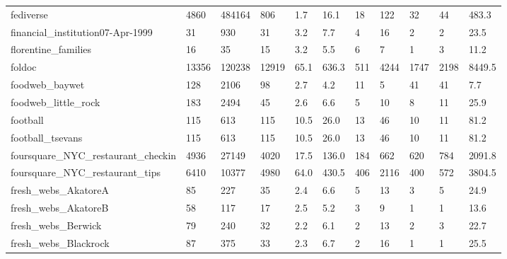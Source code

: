 \begin{longtable}{lllllllllll}
 fediverse                                          & 4860       & 484164    & 806   & 1.7    & 16.1   & 18    & 122    & 32     & 44     & 483.3   \\
 financial\_institution07-Apr-1999                   & 31         & 930       & 31    & 3.2    & 7.7    & 4     & 16     & 2      & 2      & 23.5    \\
 florentine\_families                                & 16         & 35        & 15    & 3.2    & 5.5    & 6     & 7      & 1      & 3      & 11.2    \\
 foldoc                                             & 13356      & 120238    & 12919 & 65.1   & 636.3  & 511   & 4244   & 1747   & 2198   & 8449.5  \\
 foodweb\_baywet                                     & 128        & 2106      & 98    & 2.7    & 4.2    & 11    & 5      & 41     & 41     & 7.7     \\
 foodweb\_little\_rock                                & 183        & 2494      & 45    & 2.6    & 6.6    & 5     & 10     & 8      & 11     & 25.9    \\
 football                                           & 115        & 613       & 115   & 10.5   & 26.0   & 13    & 46     & 10     & 11     & 81.2    \\
 football\_tsevans                                   & 115        & 613       & 115   & 10.5   & 26.0   & 13    & 46     & 10     & 11     & 81.2    \\
 foursquare\_NYC\_restaurant\_checkin                  & 4936       & 27149     & 4020  & 17.5   & 136.0  & 184   & 662    & 620    & 784    & 2091.8  \\
 foursquare\_NYC\_restaurant\_tips                     & 6410       & 10377     & 4980  & 64.0   & 430.5  & 406   & 2116   & 400    & 572    & 3804.5  \\
 fresh\_webs\_AkatoreA                                & 85         & 227       & 35    & 2.4    & 6.6    & 5     & 13     & 3      & 5      & 24.9    \\
 fresh\_webs\_AkatoreB                                & 58         & 117       & 17    & 2.5    & 5.2    & 3     & 9      & 1      & 1      & 13.6    \\
 fresh\_webs\_Berwick                                 & 79         & 240       & 32    & 2.2    & 6.1    & 2     & 13     & 2      & 3      & 22.7    \\
 fresh\_webs\_Blackrock                               & 87         & 375       & 33    & 2.3    & 6.7    & 2     & 16     & 1      & 1      & 25.5    \\

\end{longtable}
